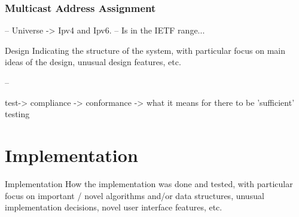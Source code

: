 \documentclass[11pt,a4paper]{report}
\begin{document}
\subsubsection{Multicast Address Assignment}
-- Universe -> Ipv4 and Ipv6. 
-- Is in the IETF range...


	Design
	Indicating the structure of the system, with particular
	focus on main ideas of the design, unusual design
	features, etc.

--
	
test-> compliance -> conformance -> what it means for there to be 'sufficient' testing
	
\section{Implementation}
Implementation
How the implementation was done and tested, with particular focus on important / novel algorithms and/or data structures, unusual implementation decisions, novel user interface features, etc.
	
\end{document}

